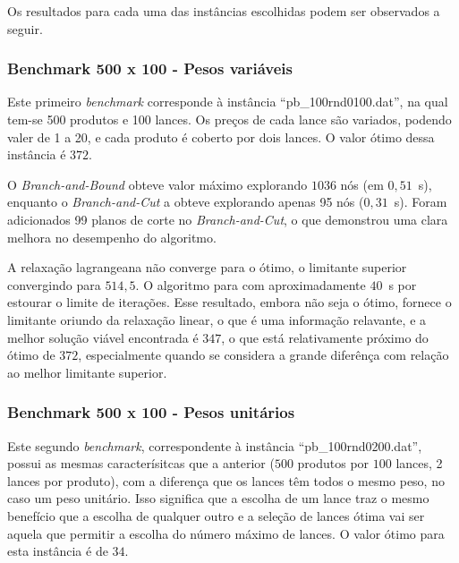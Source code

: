 \documentclass{article}
\begin{document}
    Os resultados para cada uma das instâncias escolhidas podem ser observados a seguir. 
    
    
    \subsubsection{Benchmark 500 x 100 - Pesos variáveis}%
    \label{sec:res:ssec:bchmrk1}
    
    Este primeiro \emph{benchmark} corresponde à instância \enquote{pb\_100rnd0100.dat}, na qual tem-se 500 produtos e 100 lances. Os preços de cada lance são variados, podendo valer de 1 a 20, e cada produto é coberto por dois lances. O valor ótimo dessa instância é $372$.
    
    O \emph{Branch-and-Bound} obteve valor máximo explorando $ 1036 $ nós (em $ 0{,}51 $~s), enquanto o \emph{Branch-and-Cut} a obteve explorando apenas 95 nós ($ 0{,}31 $~s). Foram adicionados 99 planos de corte no \emph{Branch-and-Cut}, o que demonstrou uma clara melhora no desempenho do algoritmo.
    
    A relaxação lagrangeana não converge para o ótimo, o limitante superior convergindo para $ 514{,}5 $. O algoritmo para com aproximadamente $40$~s por estourar o limite de iterações.  Esse resultado, embora não seja o ótimo, fornece o limitante oriundo da relaxação linear, o que é uma informação relavante, e a melhor solução viável encontrada é $347$, o que está relativamente próximo do ótimo de $372$, especialmente quando se considera a grande diferênça com relação ao melhor limitante superior.
    
    
    \subsubsection{Benchmark 500 x 100 - Pesos unitários}
    
    Este segundo \emph{benchmark}, correspondente à instância \enquote{pb\_100rnd0200.dat}, possui as mesmas caracterísitcas que a anterior ($500$ produtos por $100$ lances, 2 lances por produto), com a diferença que os lances têm todos o mesmo peso, no caso um peso unitário. Isso significa que a escolha de um lance traz o mesmo benefício que a escolha de qualquer outro e a seleção de lances ótima vai ser aquela que permitir a escolha do número máximo de lances. O valor ótimo para esta instância é de $34$.
    
\end{document}
